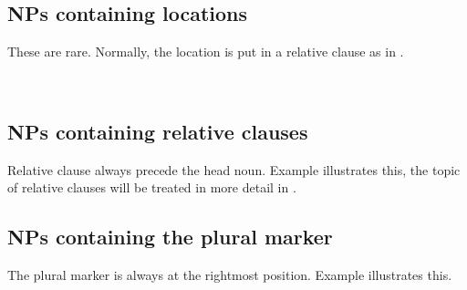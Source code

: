 \subsection{NPs containing locations}\label{sec:nppp:NPscontaininglocations}
These are rare. Normally, the location is put in a relative clause as in .


 \\
%
%
\subsection{NPs containing relative clauses}\label{sec:nppp:NPscontainingrelativeclauses}
Relative clause always precede the head noun. Example  illustrates this, the topic of relative clauses will be treated in more detail in .


\subsection{NPs containing the plural marker}\label{sec:nppp:NPscontainingthepluralmarker}
The plural marker is always at the rightmost position.
Example  illustrates this.

\\

